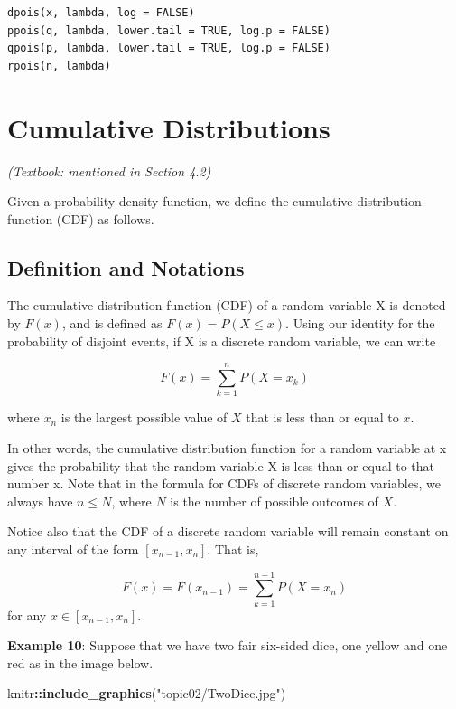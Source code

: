 \documentclass[
]{book}
\newenvironment{Shaded}{\begin{snugshade}}{\end{snugshade}}
\newcommand{\FunctionTok}[1]{\textcolor[rgb]{0.13,0.29,0.53}{\textbf{#1}}}
\newcommand{\NormalTok}[1]{#1}
\newcommand{\SpecialCharTok}[1]{\textcolor[rgb]{0.81,0.36,0.00}{\textbf{#1}}}
\newcommand{\StringTok}[1]{\textcolor[rgb]{0.31,0.60,0.02}{#1}}
\begin{document}
\begin{verbatim}
dpois(x, lambda, log = FALSE)
ppois(q, lambda, lower.tail = TRUE, log.p = FALSE)
qpois(p, lambda, lower.tail = TRUE, log.p = FALSE)
rpois(n, lambda)
\end{verbatim}

\hypertarget{cumulative-distributions}{%
\section{Cumulative Distributions}\label{cumulative-distributions}}

\emph{(Textbook: mentioned in Section 4.2)}

Given a probability density function, we define the cumulative distribution function (CDF) as follows.

\hypertarget{definition-and-notations}{%
\subsection{Definition and Notations}\label{definition-and-notations}}

The cumulative distribution function (CDF) of a random variable X is denoted by \(F(x)\), and is defined as \(F(x) = P(X \le x)\). Using our identity for the probability of disjoint events, if X is a discrete random variable, we can write

\[
F(x) = \sum_{k=1}^n P(X = x_k)
\]

where \(x_n\) is the largest possible value of \(X\) that is less than or equal to \(x\).

In other words, the cumulative distribution function for a random variable at x gives the probability that the random variable X is less than or equal to that number x. Note that in the formula for CDFs of discrete random variables, we always have \(n \le N\), where \(N\) is the number of possible outcomes of \(X\).

Notice also that the CDF of a discrete random variable will remain constant on any interval of the form \([x_{n-1}, x_n]\). That is,

\[
F(x) = F(x_{n-1}) = \sum_{k=1}^{n-1} P(X = x_n)
\]
for any \(x\in [x_{n-1}, x_n]\).

\textbf{Example 10}: Suppose that we have two fair six-sided dice, one yellow and one red as in the image below.

\begin{Shaded}
\begin{Highlighting}[]
\NormalTok{knitr}\SpecialCharTok{::}\FunctionTok{include\_graphics}\NormalTok{(}\StringTok{"topic02/TwoDice.jpg"}\NormalTok{)}
\end{Highlighting}
\end{Shaded}
\end{document}
